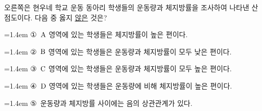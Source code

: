 \noindent\begin{minipage}[t]{0.58\linewidth}\vspace{0pt}\raggedright 오른쪽은 현우네 학교 운동 동아리 학생들의 운동량과 체지방률을 조사하여 나타낸 산점도이다. 다음 중 옳지 \underline{않은} 것은?\end{minipage}\hfill\begin{minipage}[t]{0.4\linewidth}\vspace{0pt}\centering \resizebox{\ifdim\width>\linewidth\linewidth\else\width\fi}{!}{}\end{minipage}\par
\par\medskip\par\noindent\hangindent=1.4em {\small ①}\ $\mathrm{A}$ 영역에 있는 학생들은 체지방률이 높은 편이다.\par\noindent\hangindent=1.4em {\small ②}\ $\mathrm{B}$ 영역에 있는 학생들은 운동량과 체지방률이 모두 낮은 편이다.\par\noindent\hangindent=1.4em {\small ③}\ $\mathrm{C}$ 영역에 있는 학생들은 운동량과 체지방률이 모두 높은 편이다.\par\noindent\hangindent=1.4em {\small ④}\ $\mathrm{D}$ 영역에 있는 학생들은 운동량에 비해 체지방률이 높은 편이다.\par\noindent\hangindent=1.4em {\small ⑤}\ 운동량과 체지방률 사이에는 음의 상관관계가 있다.\par\medskip
